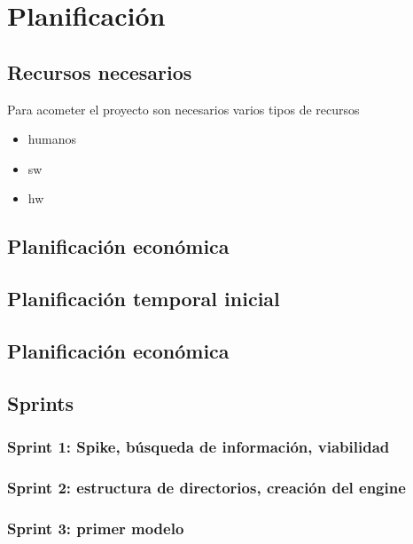 
\chapter{Planificación}
\label{chap:planificación}

\section{Recursos necesarios}

Para acometer el proyecto son necesarios varios tipos de recursos

\begin{itemize}
    \item humanos    
    \item sw
    \item hw
\end{itemize}

\section{Planificación económica}

\section{Planificación temporal inicial}

\section{Planificación económica}

\section{Sprints}

\subsection{Sprint 1: Spike, búsqueda de información, viabilidad}
\subsection{Sprint 2: estructura de directorios, creación del engine}
\subsection{Sprint 3: primer modelo}
